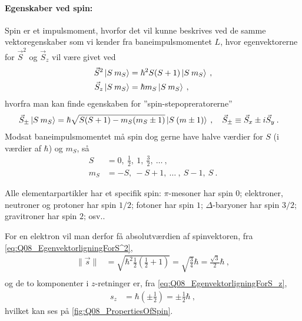 \paragraph{Egenskaber ved spin:} Spin er et impulsmoment, hvorfor det vil kunne beskrives ved de samme vektoregenskaber som vi kender fra baneimpulsmomentet $L$, hvor egenvektorerne for $\Vec{S}^2$ og $\Vec{S}_z$ vil være givet ved
\begin{align}
    \Vec{S}^2\ket{S \: m_S} &= \hbar^2 S(S+1) \ket{S \: m_S} \label{eq:Q08_EgenvektorligningForS^2} \: , \\
    \Vec{S}_z\ket{S \: m_S} &= \hbar m_S \ket{S \: m_S} \: , \label{eq:Q08_EgenvektorligningForS_z}
\end{align}
hvorfra man kan finde egenskaben for ''spin-stepopreratorerne''
\begin{align}
    \Vec{S}_\pm \ket{S \: m_S} &= \hbar \sqrt{S(S+1) - m_S(m_S \pm 1)} \ket{S \: (m \pm 1)} \: , \quad \Vec{S}_\pm \equiv \Vec{S}_x \pm i \Vec{S}_y \: .
\end{align}
\noindent
Modsat baneimpulsmomentet må spin dog gerne have halve værdier for $S$ (i værdier af $\hbar$) og $m_S$, så
\begin{align}
    S &= 0, \: \frac{1}{2}, \: 1, \: \frac{3}{2}, \: \ldots \: , \\
    m_S &= -S, \: -S + 1, \: \ldots \: , \: S - 1, \: S \: .
\end{align}

Alle elementarpartikler har et specifik spin: $\pi$-mesoner har spin $0$; elektroner, neutroner og protoner har spin $1/2$; fotoner har spin $1$; $\Delta$-baryoner har spin $3/2$; gravitroner har spin $2$; osv..

\noindent
For en elektron vil man derfor få absolutværdien af spinvektoren, fra \cref{eq:Q08_EgenvektorligningForS^2},
\begin{align}
    \| \Vec{s} \| &= \sqrt{\hbar^2 \frac{1}{2}\left(\frac{1}{2}+1\right)} = \sqrt{\frac{3}{4}}\hbar = \frac{\sqrt{3}}{2} \hbar  \: , \\
\end{align}
og de to komponenter i $z$-retninger er, fra \cref{eq:Q08_EgenvektorligningForS_z},
\begin{align}
    s_z &= \hbar \left(\pm \frac{1}{2}\right) = \pm \frac{1}{2}\hbar \: ,
\end{align}
hvilket kan ses på \cref{fig:Q08_PropertiesOfSpin}.

